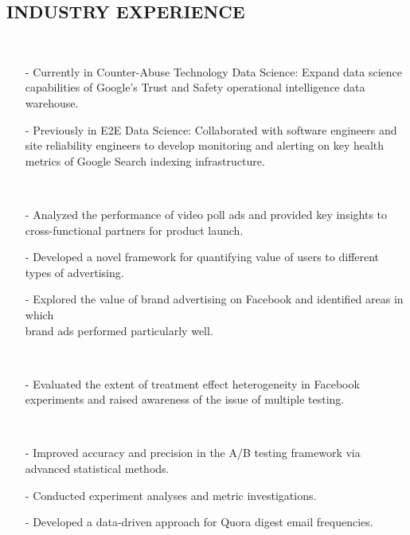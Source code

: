 \documentclass{res}
\begin{document}
\begin{resume}
\section{INDUSTRY EXPERIENCE}

     \\ 
            \begin{itemize}\setlength\itemsep{0em}
        \item[-] Currently in Counter-Abuse Technology Data Science: Expand data science capabilities of Google's Trust and Safety operational intelligence data warehouse.
        \item[-] Previously in E2E Data Science: Collaborated with software engineers and site reliability engineers to develop monitoring and alerting on key health metrics of Google Search indexing infrastructure.
        \end{itemize}

     \\ 
            \begin{itemize}\setlength\itemsep{0em}
        \item[-] Analyzed the performance of video poll ads and provided key insights to cross-functional partners for product launch. 
\item[-]  Developed a novel framework for quantifying value of users to different types of advertising. 
\item[-] Explored the value of brand advertising on Facebook and identified areas in which \\brand ads performed particularly well. 
        \end{itemize}

     \\ 
            \begin{itemize}\setlength\itemsep{0em}
        \item[-] Evaluated the extent of treatment effect heterogeneity in Facebook experiments and raised awareness of the issue of multiple testing.
        \end{itemize}
  
     \\
    \begin{itemize}
     \item[-] Improved accuracy and precision in the A/B testing framework via advanced statistical methods.
     \item[-] Conducted experiment analyses and metric investigations.
     \item[-] Developed a data-driven approach for Quora digest email frequencies.
     \end{itemize}  
   

\end{resume}
\end{document}
